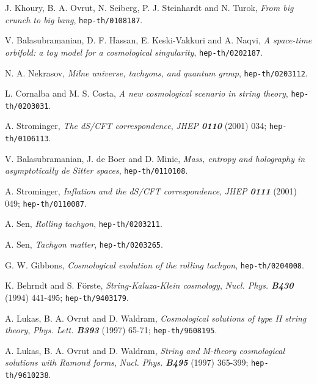 \documentclass[a4paper,aps,nofootinbib,showpacs,preprint]{revtex4}
\begin{document}
\begin{thebibliography}{99}

    J. Khoury, B. A. Ovrut, N. Seiberg, P. J. Steinhardt and N. Turok,
    {\sl From big crunch to big bang},
    {\tt hep-th/0108187}.

    V. Balasubramanian, D. F. Hassan, E. Keski-Vakkuri and A. Naqvi,
    {\sl A space-time orbifold: a toy model for a cosmological singularity},
    {\tt hep-th/0202187}.

    N. A. Nekrasov,
    {\sl Milne universe, tachyons, and quantum group},
    {\tt hep-th/0203112}.

    L. Cornalba and M. S. Costa,
    {\sl A new cosmological scenario in string theory},
    {\tt hep-th/0203031}.

    A. Strominger,
    {\sl The dS/CFT correspondence},
    {\it JHEP \bf 0110} (2001) 034;
    {\tt hep-th/0106113}.

    V. Balasubramanian, J. de Boer and D. Minic,
    {\sl Mass, entropy and holography in asymptotically de Sitter spaces},
    {\tt hep-th/0110108}.

    A. Strominger,
    {\sl Inflation and the dS/CFT correspondence},
    {\it JHEP \bf 0111} (2001) 049;
    {\tt hep-th/0110087}.

    A. Sen,
    {\sl Rolling tachyon},
    {\tt hep-th/0203211}.

    A. Sen,
    {\sl Tachyon matter},
    {\tt hep-th/0203265}.

    G. W. Gibbons,
    {\sl Cosmological evolution of the rolling tachyon},
    {\tt hep-th/0204008}.

    K. Behrndt and S. F\"{o}rste,
    {\sl String-Kaluza-Klein cosmology},
    {\it Nucl. Phys. \bf B430} (1994) 441-495;
    {\tt hep-th/9403179}.

    A. Lukas, B. A. Ovrut and D. Waldram,
    {\sl Cosmological solutions of type II string theory},
    {\it Phys. Lett. \bf B393} (1997) 65-71;
    {\tt hep-th/9608195}.

    A. Lukas, B. A. Ovrut and D. Waldram,
    {\sl String and M-theory cosmological solutions with Ramond forms},
    {\it Nucl. Phys. \bf B495} (1997) 365-399;
    {\tt hep-th/9610238}.


\end{thebibliography}
\end{document}
